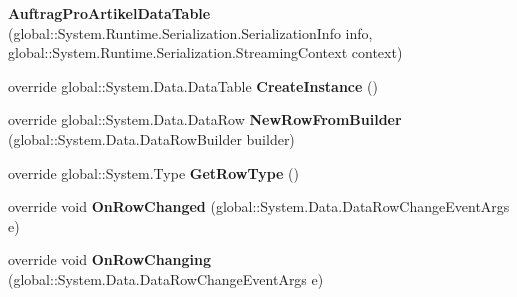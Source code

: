 \begin{DoxyCompactItemize}
\item 
{\bfseries Auftrag\+Pro\+Artikel\+Data\+Table} (global\+::\+System.\+Runtime.\+Serialization.\+Serialization\+Info info, global\+::\+System.\+Runtime.\+Serialization.\+Streaming\+Context context)\hypertarget{class_products_1_1_data_1_1ds_sage_1_1_auftrag_pro_artikel_data_table_a2093cb6ed743c62c602ee0de802394c8}{}\label{class_products_1_1_data_1_1ds_sage_1_1_auftrag_pro_artikel_data_table_a2093cb6ed743c62c602ee0de802394c8}

\item 
override global\+::\+System.\+Data.\+Data\+Table {\bfseries Create\+Instance} ()\hypertarget{class_products_1_1_data_1_1ds_sage_1_1_auftrag_pro_artikel_data_table_a8df6268ad00a37b4abe251ee2b77064d}{}\label{class_products_1_1_data_1_1ds_sage_1_1_auftrag_pro_artikel_data_table_a8df6268ad00a37b4abe251ee2b77064d}

\item 
override global\+::\+System.\+Data.\+Data\+Row {\bfseries New\+Row\+From\+Builder} (global\+::\+System.\+Data.\+Data\+Row\+Builder builder)\hypertarget{class_products_1_1_data_1_1ds_sage_1_1_auftrag_pro_artikel_data_table_a4ff4d20f316fd93db4d16c5bea745c54}{}\label{class_products_1_1_data_1_1ds_sage_1_1_auftrag_pro_artikel_data_table_a4ff4d20f316fd93db4d16c5bea745c54}

\item 
override global\+::\+System.\+Type {\bfseries Get\+Row\+Type} ()\hypertarget{class_products_1_1_data_1_1ds_sage_1_1_auftrag_pro_artikel_data_table_a31eb0cda5f8ec5f75ccc39a0e2464590}{}\label{class_products_1_1_data_1_1ds_sage_1_1_auftrag_pro_artikel_data_table_a31eb0cda5f8ec5f75ccc39a0e2464590}

\item 
override void {\bfseries On\+Row\+Changed} (global\+::\+System.\+Data.\+Data\+Row\+Change\+Event\+Args e)\hypertarget{class_products_1_1_data_1_1ds_sage_1_1_auftrag_pro_artikel_data_table_ad60f470f69bd3b4cace4723cf29449de}{}\label{class_products_1_1_data_1_1ds_sage_1_1_auftrag_pro_artikel_data_table_ad60f470f69bd3b4cace4723cf29449de}

\item 
override void {\bfseries On\+Row\+Changing} (global\+::\+System.\+Data.\+Data\+Row\+Change\+Event\+Args e)\hypertarget{class_products_1_1_data_1_1ds_sage_1_1_auftrag_pro_artikel_data_table_aa7ed72df67b65f0d5d5655f1a7ad359e}{}\label{class_products_1_1_data_1_1ds_sage_1_1_auftrag_pro_artikel_data_table_aa7ed72df67b65f0d5d5655f1a7ad359e}


\end{DoxyCompactItemize}
